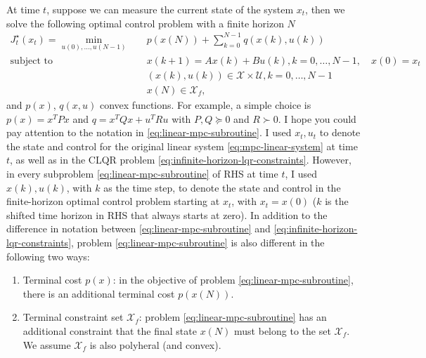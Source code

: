 \documentclass[
]{book}
\theoremstyle{definition}
\theoremstyle{definition}
\theoremstyle{definition}
\theoremstyle{definition}
\theoremstyle{remark}
\begin{document}
At time \(t\), suppose we can measure the current state of the system \(x_t\), then we solve the following optimal control problem with a finite horizon \(N\)
\begin{equation}
\begin{split}
J_t^\star(x_t) = \min_{u(0),\dots,u(N-1)} & \quad p(x(N)) + \sum_{k=0}^{N-1} q(x(k),u(k)) \\
\text{subject to} & \quad x(k+1) = A x(k) + B u(k), k =0, \dots, N-1, \quad x(0) = x_t \\
& \quad (x(k),u(k)) \in \mathcal{X} \times \mathcal{U}, k=0,\dots,N-1 \\
& \quad x(N) \in \mathcal{X}_f,
\end{split}
\label{eq:linear-mpc-subroutine}
\end{equation}
and \(p(x)\), \(q(x,u)\) convex functions. For example, a simple choice is \(p(x) = x^T P x\) and \(q = x^T Q x + u^T R u\) with \(P,Q\succeq 0\) and \(R \succ 0\).
I hope you could pay attention to the notation in \eqref{eq:linear-mpc-subroutine}. I used \(x_t, u_t\) to denote the state and control for the original linear system \eqref{eq:mpc-linear-system} at time \(t\), as well as in the CLQR problem \eqref{eq:infinite-horizon-lqr-constraints}. However, in every subproblem \eqref{eq:linear-mpc-subroutine} of RHS at time \(t\), I used \(x(k),u(k)\), with \(k\) as the time step, to denote the state and control in the finite-horizon optimal control problem starting at \(x_t\), with \(x_t = x(0)\) (\(k\) is the shifted time horizon in RHS that always starts at zero). In addition to the difference in notation between \eqref{eq:linear-mpc-subroutine} and \eqref{eq:infinite-horizon-lqr-constraints}, problem \eqref{eq:linear-mpc-subroutine} is also different in the following two ways:

\begin{enumerate}
\def\labelenumi{\arabic{enumi}.}
\item
  Terminal cost \(p(x)\): in the objective of problem \eqref{eq:linear-mpc-subroutine}, there is an additional terminal cost \(p(x(N))\).
\item
  Terminal constraint set \(\mathcal{X}_f\): problem \eqref{eq:linear-mpc-subroutine} has an additional constraint that the final state \(x(N)\) must belong to the set \(\mathcal{X}_f\). We assume \(\mathcal{X}_f\) is also polyheral (and convex).
\end{enumerate}
\end{document}
